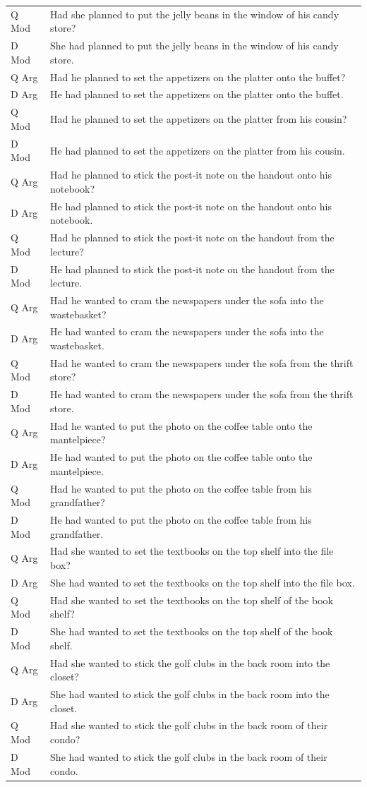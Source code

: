 \documentclass[12pt,oneside]{book}
\begin{document}
\begin{longtable}{ll}
Q Mod & Had she planned to put the jelly beans in the window of his candy store?\\
D Mod & She had planned to put the jelly beans in the window of his candy store.\\
\addlinespace
Q Arg & Had he planned to set the appetizers on the platter onto the buffet?\\
D Arg & He had planned to set the appetizers on the platter onto the buffet.\\
Q Mod & Had he planned to set the appetizers on the platter from his cousin?\\
D Mod & He had planned to set the appetizers on the platter from his cousin.\\
\addlinespace
Q Arg & Had he planned to stick the post-it note on the handout onto his notebook?\\
D Arg & He had planned to stick the post-it note on the handout onto his notebook.\\
Q Mod & Had he planned to stick the post-it note on the handout from the lecture?\\
D Mod & He had planned to stick the post-it note on the handout from the lecture.\\
\addlinespace
Q Arg & Had he wanted to cram the newspapers under the sofa into the wastebasket?\\
D Arg & He had wanted to cram the newspapers under the sofa into the wastebasket.\\
Q Mod & Had he wanted to cram the newspapers under the sofa from the thrift store?\\
D Mod & He had wanted to cram the newspapers under the sofa from the thrift store.\\
\addlinespace
Q Arg & Had he wanted to put the photo on the coffee table onto the mantelpiece?\\
D Arg & He had wanted to put the photo on the coffee table onto the mantelpiece.\\
Q Mod & Had he wanted to put the photo on the coffee table from his grandfather?\\
D Mod & He had wanted to put the photo on the coffee table from his grandfather.\\
\addlinespace
Q Arg & Had she wanted to set the textbooks on the top shelf into the file box?\\
D Arg & She had wanted to set the textbooks on the top shelf into the file box.\\
Q Mod & Had she wanted to set the textbooks on the top shelf of the book shelf?\\
D Mod & She had wanted to set the textbooks on the top shelf of the book shelf.\\
\addlinespace
Q Arg & Had she wanted to stick the golf clubs in the back room into the closet?\\
D Arg & She had wanted to stick the golf clubs in the back room into the closet.\\
Q Mod & Had she wanted to stick the golf clubs in the back room of their condo?\\
D Mod & She had wanted to stick the golf clubs in the back room of their condo.\\*
\end{longtable}
\end{document}
